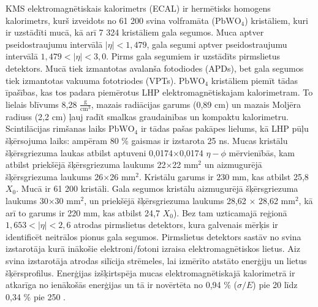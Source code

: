 KMS elektromagnētiskais kalorimetrs (ECAL) ir hermētisks homogens kalorimetrs, kurš izveidots no 61 200 svina volframāta ($\text{PbWO}_{4}$) kristāliem, kuri ir uzstādīti mucā, kā arī 7 324 kristāliem gala segumos. Muca aptver pseido\gls{straujumu} intervālā $\left|\eta\right|<1,479$, gala segumi aptver pseidostraujumu intervālā $1,479<\left|\eta\right|<3,0$. Pirms gala segumiem ir uzstādīts pirmslietus detektors. Mucā tiek izmantotas avalanša fotodiodes (APDs), bet gala segumos tiek izmantotas vakuuma fototriodes (VPTs). $\text{PbWO}_{4}$ kristāliem piemīt tādas īpašības, kas tos padara piemērotus LHP elektromagnētiskajam kalorimetram. To lielais blīvums 8,28 $\frac{\text{g}}{\text{cm}^3}$, mazais radiācijas garums (0,89 cm)  un mazais Moljēra radiuss (2,2 cm) ļauj radīt smalkas graudainības un kompaktu kalorimetru. Scintilācijas rimšanas laiks $\text{PbWO}_{4}$ ir tādas pašas pakāpes lielums, kā LHP pūļu šķērsojuma laiks: ampēram 80 \% gaismas ir izstarota 25 ns. Mucas kristālu šķērsgriezuma laukas atbilst aptuveni 0,0174$\times$0,0174 $\eta - \phi$ mērvienībās, kam atbilst priekšējā šķērsgriezuma laukums 22$\times$22 $\text{mm}^2$ un aizmugurējā šķērsgriezuma laukums 26$\times$26 $\text{mm}^2$. Kristālu garums ir 230 mm, kas atbilst 25,8 $X_{0}$. Mucā ir 61 200 kristāli. Gala segumos kristālu aizmugurējā šķērsgriezuma laukums 30$\times$30 $\text{mm}^2$,  un priekšējā šķērsgriezuma laukums 28,62 $\times$ 28,62 $\text{mm}^2$, kā arī to garums ir 220 mm, kas atbilst 24,7 $X_{0}$). Bez tam \gls{uzticamajā reģionā} $1,653<\left|\eta\right|<2,6$ atrodas pirmslietus detektors, kura galvenais mērķis ir identificēt neitrālos pionus gala segumos. Pirmslietus detektors sastāv no svina izstarotāja kurā inākošie elektroni/fotoni izraisa elektromagnētiskos lietus. Aiz svina izstarotāja atrodas silīcija strēmeles, lai izmērīto atstāto enerģiju un lietus šķērsprofilus. Enerģijas izšķirtspēja mucas elektromagnētiskajā kalorimetrā ir atkarīga no ienākošās enerģijas un tā ir novērtēta no 0,94 \% ($\sigma/E$) pie 20 \GeV līdz 0,34 \% pie 250 \GeV \cite{Adzic:2007mi}. 

